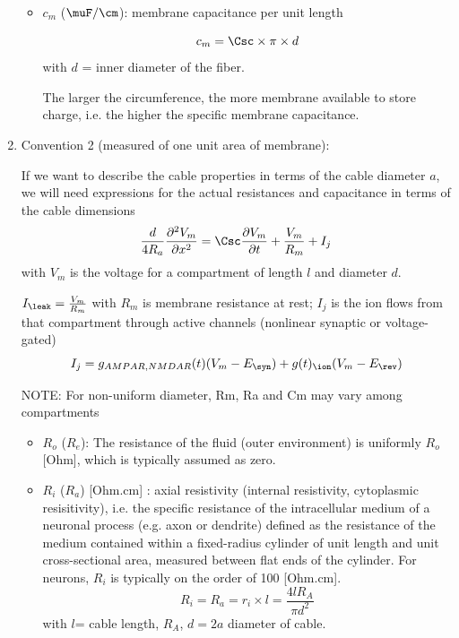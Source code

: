 \begin{enumerate}
\begin{itemize}
   \item $c_m$ ($\muF/\cm$): %
   membrane capacitance per unit length
   
\begin{equation}
c_m = \Csc \times \pi \times d
\end{equation} 
with $d$ = inner diameter of the fiber.

The larger the circumference, the more membrane available to store charge, i.e.
the higher the specific membrane capacitance.
 
  \end{itemize}
  
  \item Convention 2 (measured of one unit area of membrane): 
  
  If we want to describe the cable properties in terms of the cable
diameter $a$, we will need expressions for the actual resistances and capacitance in
terms of the cable dimensions
\begin{equation}
\frac{d}{4R_a} \frac{\partial^2 V_m}{\partial x^2} = \Csc \frac{\partial
V_m}{\partial t} + \frac{V_m}{R_m} + I_j
\end{equation}
with $V_m$ is the voltage for a compartment of length $l$ and diameter $d$.

$I_\leak = \frac{V_m}{R_m}$ with $R_m$ is membrane resistance at rest;
$I_j$ is the ion flows from that compartment through active channels (nonlinear
synaptic or voltage-gated)
\begin{equation}
I_j = g_{AMPAR, NMDAR}(t) (V_m - E_\syn) + g(t)_\ion (V_m - E_\rev)
\end{equation}

NOTE: For non-uniform diameter, Rm, Ra and Cm may vary among compartments

  \begin{itemize}
    \item $R_o$ ($R_e$): The resistance of the fluid (outer
  environment) is uniformly $R_o$ [Ohm], which is typically assumed as zero.
  
  
  \item $R_i$ ($R_a$) [Ohm.cm] : axial resistivity (internal resistivity,
  cytoplasmic resisitivity), i.e. the specific resistance of the intracellular medium of a
  neuronal process (e.g. axon or dendrite) defined as the resistance of the
  medium contained within a fixed-radius cylinder of unit length and unit
  cross-sectional area, measured between flat ends of the cylinder. For neurons,
  $R_i$ is typically on the order of 100 [Ohm.cm].
 \begin{equation}
 R_i = R_a = r_i \times l = \frac{4 l R_A}{\pi d^2}
 \end{equation}
 with $l$= cable length, $R_A$, $d=2a$ diameter of cable.


\end{itemize}
\end{enumerate}

